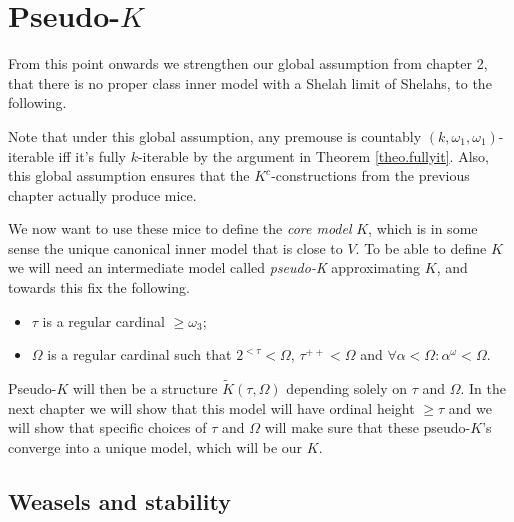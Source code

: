 \chapter{Pseudo-$K$}
\thispagestyle{fancy}
\label{ch7}

From this point onwards we strengthen our global assumption from chapter 2, that there is no proper class inner model with a Shelah limit of Shelahs, to the following.

\begin{center}
\end{center}

Note that under this global assumption, any premouse is countably $(k,\omega_1,\omega_1)$-iterable iff it's fully $k$-iterable by the argument in Theorem \ref{theo.fullyit}. Also, this global assumption ensures that the $K^c$-constructions from the previous chapter actually produce mice.

\qquad We now want to use these mice to define the \textit{core model} $K$, which is in some sense the unique canonical inner model that is close to $V$. To be able to define $K$ we will need an intermediate model called \textit{pseudo-K} approximating $K$, and towards this fix the following.
\begin{itemize}
\item $\tau$ is a regular cardinal $\geq\omega_3$;
\item $\Omega$ is a regular cardinal such that $2^{<\tau}<\Omega$, $\tau^{++}<\Omega$ and $\forall\alpha<\Omega:\alpha^\omega<\Omega$.\\
\end{itemize}

Pseudo-$K$ will then be a structure $\tilde K(\tau,\Omega)$ depending solely on $\tau$ and $\Omega$. In the next chapter we will show that this model will have ordinal height $\geq\tau$ and we will show that specific choices of $\tau$ and $\Omega$ will make sure that these pseudo-$K$'s converge into a unique model, which will be our $K$.\\


\section{Weasels and stability}


